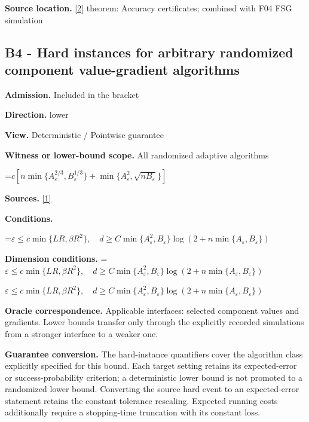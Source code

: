 \documentclass[10pt,a4paper]{article}
\newcommand{\AtlasMath}[1]{\par\begingroup\centering\setbox0=\hbox{$\displaystyle #1$}\ifdim\wd0>1.4\linewidth\typeout{ATLAS WIDE FORMULA: \the\wd0}\fi\ifdim\wd0>\linewidth\resizebox{\linewidth}{!}{\box0}\else\box0\fi\par\endgroup}
\newcommand{\AtlasInlineMath}[1]{\begingroup\setbox0=\hbox{$#1$}\ifdim\wd0>.4\linewidth\endgroup\AtlasMath{#1}\else\endgroup$#1$\fi}
\begin{document}
\textbf{Source location.} \href{https://www2.isye.gatech.edu/~nemirovs/MOR_AccuracyCertificates.pdf}{[2]} theorem: Accuracy certificates; combined with F04 FSG simulation



\subsection{B4 - Hard instances for arbitrary randomized component value-gradient algorithms}


\textbf{Admission.} Included in the bracket



\textbf{Direction.} lower



\textbf{View.} Deterministic / Pointwise guarantee



\textbf{Witness or lower-bound scope.} All randomized adaptive algorithms



\AtlasMath{c[n\min\{A_\varepsilon^{2/3},B_\varepsilon^{1/3}\}+\min\{A_\varepsilon^2,\sqrt{nB_\varepsilon}\}]}


\textbf{Sources.} \href{https://arxiv.org/pdf/2105.01778}{[1]}



\textbf{Conditions.}
\AtlasMath{\varepsilon\le c\min\{LR,\beta R^2\},\quad d\ge C\min\{A_\varepsilon^2,B_\varepsilon\}\log(2+n\min\{A_\varepsilon,B_\varepsilon\})}




\textbf{Dimension conditions.} \AtlasInlineMath{\varepsilon\le c\min\{LR,\beta R^2\},\quad d\ge C\min\{A_\varepsilon^2,B_\varepsilon\}\log(2+n\min\{A_\varepsilon,B_\varepsilon\})}



\textbf{Oracle correspondence.} Applicable interfaces: selected component values and gradients. Lower bounds transfer only through the explicitly recorded simulations from a stronger interface to a weaker one.



\textbf{Guarantee conversion.} The hard-instance quantifiers cover the algorithm class explicitly specified for this bound. Each target setting retains its expected-error or success-probability criterion; a deterministic lower bound is not promoted to a randomized lower bound. Converting the source hard event to an expected-error statement retains the constant tolerance rescaling. Expected running costs additionally require a stopping-time truncation with its constant loss.
\end{document}

